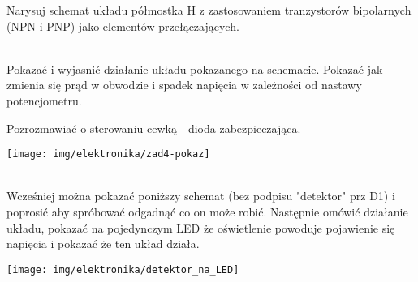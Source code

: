\documentclass{pdfBooklets}
\begin{document}

\begin{Zadanie}{}{}
Narysuj schemat układu półmostka H z zastosowaniem tranzystorów bipolarnych (NPN i PNP) jako elementów przełączających.
\end{Zadanie}



\begin{teacherOnly}
\noindent\begin{minipage}[t]{0.6\textwidth}
\\
Pokazać i wyjasnić działanie układu pokazanego na schemacie. Pokazać jak zmienia się prąd w obwodzie i spadek napięcia w zależności od nastawy potencjometru.

Pozrozmawiać o sterowaniu cewką - dioda zabezpieczająca.
\end{minipage}
\hfill
\begin{minipage}[t]{0.35\textwidth}
\vspace{-10pt}
\texttt{[image: img/elektronika/zad4-pokaz]}
\end{minipage}
\end{teacherOnly}

\begin{teacherOnly}
\noindent\begin{minipage}[t]{0.6\textwidth}
\\
Wcześniej można pokazać poniższy schemat (bez podpisu "detektor" prz D1) i poprosić aby spróbować odgadnąć co on może robić.
Następnie omówić działanie układu, pokazać na pojedynczym LED że oświetlenie powoduje pojawienie się napięcia i pokazać że ten układ działa.
\end{minipage}
\hfill
\begin{minipage}[t]{0.35\textwidth}
\vspace{-10pt}
\texttt{[image: img/elektronika/detektor\_na\_LED]}
\end{minipage}
\end{teacherOnly}
\end{document}
